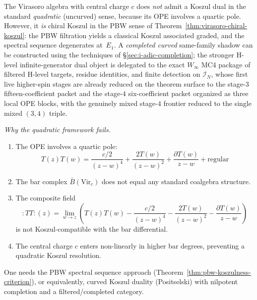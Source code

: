 \begin{remark}
The Virasoro algebra with central charge $c$ does \emph{not} admit a
Koszul dual in the standard \emph{quadratic} (uncurved) sense, because
its OPE involves a quartic pole. However, it \emph{is} chiral Koszul in
the PBW sense of Theorem~\ref{thm:virasoro-chiral-koszul}: the PBW
filtration yields a classical Koszul associated graded, and the
spectral sequence degenerates at~$E_1$.  A \emph{completed curved}
same-family shadow can be constructed using the techniques of
\S\ref{sec:i-adic-completion}; the stronger H-level infinite-generator
dual object is delegated to the exact $W_\infty$ MC4 package of
filtered H-level targets, residue identities, and finite detection on
$\mathcal{I}_N$, whose first live higher-spin stages are already
reduced on the theorem surface to the stage-$3$ fifteen-coefficient
packet and the stage-$4$ six-coefficient packet organized as three
local OPE blocks, with the genuinely mixed stage-$4$ frontier reduced
to the single mixed $(3,4)$ triple.

\emph{Why the quadratic framework fails.}
\begin{enumerate}
\item The OPE involves a quartic pole:
\begin{equation}
T(z)T(w) = \frac{c/2}{(z-w)^4} + \frac{2T(w)}{(z-w)^2} + \frac{\partial T(w)}{z-w} + \text{regular}
\end{equation}

\item The bar complex $\bar{B}(\mathrm{Vir}_c)$ does not equal any standard coalgebra structure.

\item The composite field
\begin{equation}
:TT:(z) = \lim_{w \to z} \left( T(z)T(w) - \frac{c/2}{(z-w)^4} - \frac{2T(w)}{(z-w)^2} - \frac{\partial T(w)}{z-w} \right)
\end{equation}
is not Koszul-compatible with the bar differential.

\item The central charge $c$ enters non-linearly in higher bar degrees, preventing a quadratic Koszul resolution.
\end{enumerate}
One needs the PBW spectral sequence approach (Theorem~\ref{thm:pbw-koszulness-criterion}), or equivalently, curved Koszul duality (Positselski) with nilpotent completion and a filtered/completed category.


\end{remark}
